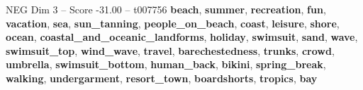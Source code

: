 \begin{textsample}{NEG Dim 3 – Score -31.00 – t007756}  \label{ex:f3_neg_003}
\textbf{beach}, \textbf{summer}, \textbf{recreation}, \textbf{fun}, \textbf{vacation}, \textbf{sea}, \textbf{sun\_tanning}, \textbf{people\_on\_beach}, \textbf{coast}, \textbf{leisure}, \textbf{shore}, \textbf{ocean}, \textbf{coastal\_and\_oceanic\_landforms}, \textbf{holiday}, \textbf{swimsuit}, \textbf{sand}, \textbf{wave}, \textbf{swimsuit\_top}, \textbf{wind\_wave}, \textbf{travel}, \textbf{barechestedness}, \textbf{trunks}, \textbf{crowd}, \textbf{umbrella}, \textbf{swimsuit\_bottom}, \textbf{human\_back}, \textbf{bikini}, \textbf{spring\_break}, \textbf{walking}, \textbf{undergarment}, \textbf{resort\_town}, \textbf{boardshorts}, \textbf{tropics}, \textbf{bay}

\end{textsample}
